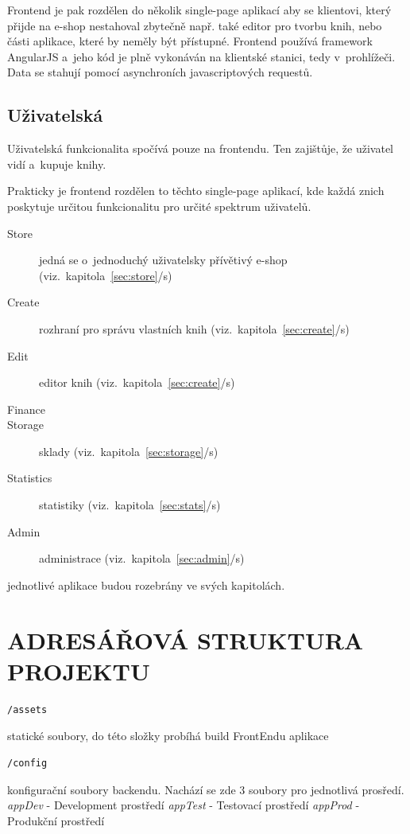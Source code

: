 \documentclass[a4paper,12pt,twoside,BCOR=10mm]{article}
\newcommand{\upc}[1]{\uppercase{#1}} %
\newcommand{\odkazNaKapitolu}[1]{(viz.~kapitola~\ref{#1}/s\pageref{#1})}
\renewcommand{\it}[1]{\textit{#1}}    %
\newenvironment{codeframe}{%
  \begin{Sbox} 
    \begin{minipage} 
      {\columnwidth-\leftmargin-\rightmargin-2\fboxsep-2\fboxrule-4pt} 
}{%

  \end{minipage} 
  \end{Sbox} 
  \begin{center} 
    \fcolorbox{black}{codeback}{\TheSbox} 
  \end{center} 
}
\begin{document}
Frontend je pak rozdělen do několik single-page aplikací aby se klientovi, který přijde na e-shop nestahoval zbytečně např. také editor pro tvorbu knih, nebo části aplikace, které by neměly být přístupné. Frontend používá framework AngularJS a~jeho kód je plně vykonáván na klientské stanici, tedy v~prohlížeči. Data se stahují pomocí asynchroních javascriptových requestů.

\subsection{Uživatelská}
Uživatelská funkcionalita spočívá pouze na frontendu. Ten zajištůje, že uživatel vidí a~kupuje knihy.

Prakticky je frontend rozdělen to těchto single-page aplikací, kde každá znich poskytuje určitou funkcionalitu pro určité spektrum uživatelů.

\begin{description}
 \item[Store] jedná se o~jednoduchý uživatelsky přívětivý e-shop \odkazNaKapitolu{sec:store}
 \item[Create] rozhraní pro správu vlastních knih \odkazNaKapitolu{sec:create}
 \item[Edit] editor knih \odkazNaKapitolu{sec:create}
 \item[Finance]
 \item[Storage] sklady \odkazNaKapitolu{sec:storage}
 \item[Statistics] statistiky \odkazNaKapitolu{sec:stats}
 \item[Admin] administrace \odkazNaKapitolu{sec:admin}
\end{description}

jednotlivé aplikace budou rozebrány ve svých kapitolách.

\section{\upc{Adresářová struktura projektu}}
\begin{codeframe}
  \begin{verbatim}
/assets
  \end{verbatim}
\end{codeframe}
statické soubory, do této složky probíhá build FrontEndu aplikace

\begin{codeframe}
  \begin{verbatim}
/config
  \end{verbatim}
\end{codeframe}
konfigurační soubory backendu. Nachází se zde 3 soubory pro jednotlivá prosředí.\newline
\it{appDev} - Development prostředí\newline
\it{appTest} - Testovací prostředí\newline
\it{appProd} - Produkční prostředí
\end{document}
